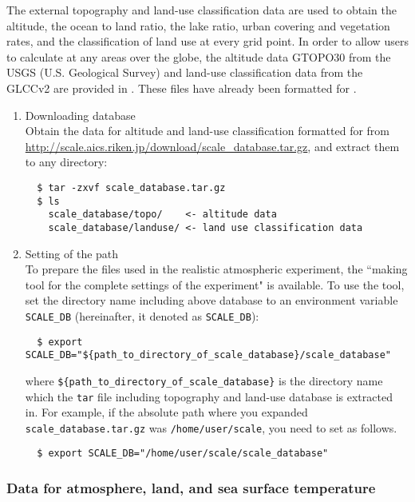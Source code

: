 The external topography and land-use classification data are used to obtain
the altitude, the ocean to land ratio, the lake ratio, urban covering and vegetation rates, and the classification of land use at every grid point.
In order to allow users to calculate at any areas over the globe,
the altitude data GTOPO30 from the USGS (U.S. Geological Survey)
and land-use classification data from the GLCCv2 are provided in \scalerm.
These files have already been formatted for \scalerm.
\begin{enumerate}
\item Downloading database\\
Obtain the data for altitude and land-use classification formatted for \scalerm  from \url{http://scale.aics.riken.jp/download/scale_database.tar.gz}, and extract them to any directory:
\begin{verbatim}
  $ tar -zxvf scale_database.tar.gz
  $ ls
    scale_database/topo/    <- altitude data
    scale_database/landuse/ <- land use classification data
\end{verbatim}
\item Setting of the path\\
To prepare the files used in the realistic atmospheric experiment,
the ``making tool for the complete settings of the experiment" is available.
To use the tool, set the directory name including above database
to an environment variable \verb|SCALE_DB| (hereinafter, it denoted as \verb|SCALE_DB|):
\begin{verbatim}
  $ export SCALE_DB="${path_to_directory_of_scale_database}/scale_database"
\end{verbatim}
where \verb|${path_to_directory_of_scale_database}| is the directory name
which the \verb|tar| file including topography and land-use database is extracted in.
For example, if the absolute path where you expanded \verb|scale_database.tar.gz|
was \verb|/home/user/scale|, you need to set as follows.
\begin{verbatim}
  $ export SCALE_DB="/home/user/scale/scale_database"
\end{verbatim}

\end{enumerate}


\subsubsection{Data for atmosphere, land, and sea surface temperature}

